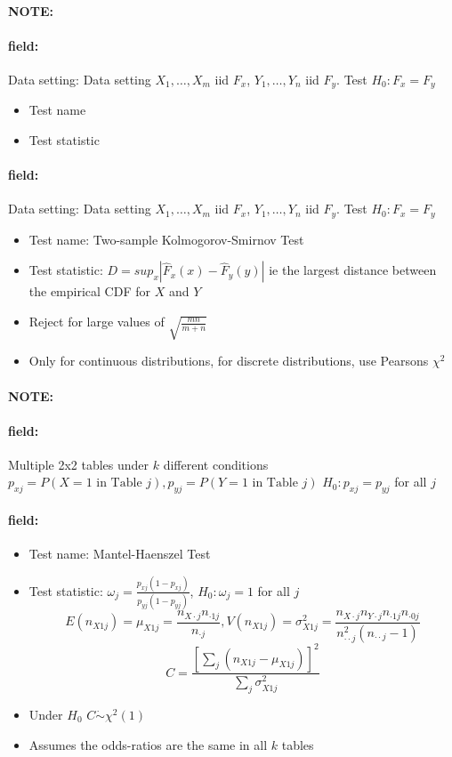 \documentclass[12pt]{article}
\newenvironment{note}{\paragraph{NOTE:}}{}
\newenvironment{field}{\paragraph{field:}}{}
\begin{document}
\begin{note}
 \begin{field}
  Data setting: Data setting $X_1, \ldots , X_m$ iid $F_x$, $Y_1, \ldots, Y_n$ iid $F_y$. Test $H_0: F_x = F_y$
  \begin{itemize}
   \item Test name
   \item Test statistic

  \end{itemize}
 \end{field}
 \begin{field}
  Data setting: Data setting $X_1, \ldots , X_m$ iid $F_x$, $Y_1, \ldots, Y_n$ iid $F_y$. Test $H_0: F_x = F_y$
  \begin{itemize}
   \item Test name: Two-sample Kolmogorov-Smirnov Test
   \item Test statistic: $D = sup_x|\hat{F}_x(x) - \hat{F}_y(y)|$ ie the largest distance between the empirical CDF for $X$ and $Y$
   \item Reject for large values of $\sqrt{\frac{mn}{m+n}}$
   \item Only for continuous distributions, for discrete distributions, use Pearsons $\chi^2$
  \end{itemize}
 \end{field}
\end{note}

\begin{note}
 \begin{field}
  Multiple 2x2 tables under $k$ different conditions $p_{xj} = P(X = 1 \text{ in Table }j), p_{yj} = P(Y = 1 \text{ in Table }j)$ $H_0: p_{xj} = p_{yj}$ for all $j$
 \end{field}

 \begin{field}
  \begin{itemize}
   \item Test name: Mantel-Haenszel Test
   \item Test statistic: $\omega_j = \frac{p_{xj}(1 - p_{xj})}{p_{yj}(1 - p_{yj})}$, $H_0: \omega_j = 1$ for all $j$
         $$E(n_{X1j}) = \mu_{X1j} = \frac{n_{X\cdot j}n_{\cdot 1 j}}{n_{\cdot j}}, V(n_{X1j}) = \sigma^2_{X1j} = \frac{n_{X\cdot j}n_{Y\cdot j}n_{\cdot 1j} n_{\cdot 0j}}{n^2_{\cdot \cdot j}(n_{\cdot \cdot j} -1)} $$
         $$ C = \frac{[\sum_{j}(n_{X1j} - \mu_{X1j})]^2}{\sum_j \sigma^2_{X1j}}$$
   \item Under $H_0$ $C \dot\sim \chi^2(1)$
   \item Assumes the odds-ratios are the same in all $k$ tables
  \end{itemize}
 \end{field}
\end{note}
\end{document}
